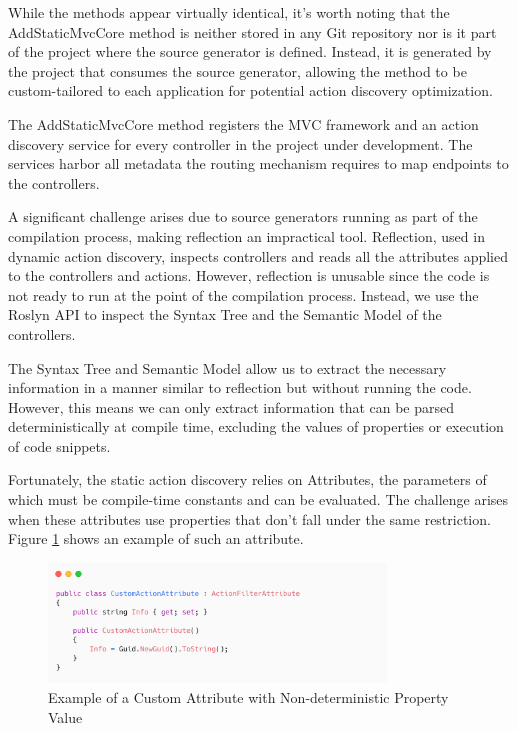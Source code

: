 While the methods appear virtually identical, it's worth noting that the AddStaticMvcCore method is neither stored in any Git repository nor is it part of the project where the source generator is defined. Instead, it is generated by the project that consumes the source generator, allowing the method to be custom-tailored to each application for potential action discovery optimization.

The AddStaticMvcCore method registers the MVC framework and an action discovery service for every controller in the project under development. The services harbor all metadata the routing mechanism requires to map endpoints to the controllers.

A significant challenge arises due to source generators running as part of the compilation process, making reflection an impractical tool. Reflection, used in dynamic action discovery, inspects controllers and reads all the attributes applied to the controllers and actions. However, reflection is unusable since the code is not ready to run at the point of the compilation process. Instead, we use the Roslyn API to inspect the Syntax Tree and the Semantic Model of the controllers.

The Syntax Tree and Semantic Model allow us to extract the necessary information in a manner similar to reflection but without running the code. However, this means we can only extract information that can be parsed deterministically at compile time, excluding the values of properties or execution of code snippets.

Fortunately, the static action discovery relies on Attributes, the parameters of which must be compile-time constants and can be evaluated. The challenge arises when these attributes use properties that don't fall under the same restriction. Figure \ref{fig:custom-property} shows an example of such an attribute.

\begin{figure}[H]
\centering
\includegraphics[width=0.8\textwidth]{graphics/custom-property.png}
\caption{Example of a Custom Attribute with Non-deterministic Property Value}
\label{fig:custom-property}
\end{figure}

